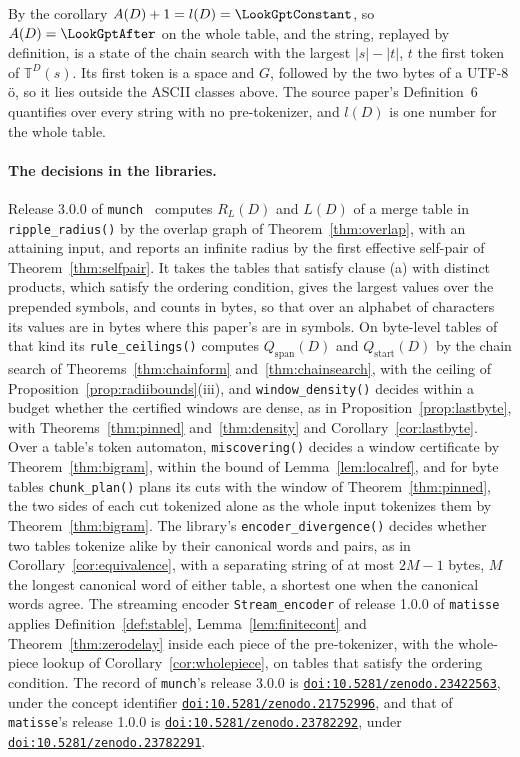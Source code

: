 \documentclass[11pt,a4paper]{article}
\newcommand{\doi}[1]{\href{https://doi.org/#1}{\nolinkurl{doi:#1}}}
\theoremstyle{definition}
\theoremstyle{plain}
\newcommand{\code}[1]{\texttt{#1}}
\newcommand{\T}{\mathbb{T}}
\newcommand{\ripple}{R_{L}}
\begin{document}
By the corollary \(A(D) + 1 = l(D) = \LookGptConstant\), so \(A(D) = \LookGptAfter\) on the whole table, and the string,
replayed by definition, is a state of the chain search with the largest \(|s| - |t|\), \(t\) the first token of
\(\T^D(s)\). Its first token is a space and \(G\), followed by the two bytes of a UTF-8 \"o, so it lies outside the
ASCII classes above. The source paper's Definition~6 quantifies over every string with no pre-tokenizer, and \(l(D)\) is
one number for the whole table.

\paragraph{The decisions in the libraries.} Release 3.0.0 of \code{munch}~\citep{munch} computes \(\ripple(D)\) and
\(L(D)\) of a merge table in \code{ripple\_radius()} by the overlap graph of Theorem~\ref{thm:overlap}, with an
attaining input, and reports an infinite radius by the first effective self-pair of Theorem~\ref{thm:selfpair}. It takes
the tables that satisfy clause (a) with distinct products, which satisfy the ordering condition, gives the largest
values over the prepended symbols, and counts in bytes, so that over an alphabet of characters its values are in bytes
where this paper's are in symbols. On byte-level tables of that kind its \code{rule\_ceilings()} computes
\(Q_{\mathrm{span}}(D)\) and \(Q_{\mathrm{start}}(D)\) by the chain search of Theorems~\ref{thm:chainform}
and~\ref{thm:chainsearch}, with the ceiling of Proposition~\ref{prop:radiibounds}(iii), and \code{window\_density()}
decides within a budget whether the certified windows are dense, as in Proposition~\ref{prop:lastbyte}, with
Theorems~\ref{thm:pinned} and~\ref{thm:density} and Corollary~\ref{cor:lastbyte}. Over a table's token automaton,
\code{miscovering()} decides a window certificate by Theorem~\ref{thm:bigram}, within the bound of
Lemma~\ref{lem:localref}, and for byte tables \code{chunk\_plan()} plans its cuts with the window of
Theorem~\ref{thm:pinned}, the two sides of each cut tokenized alone as the whole input tokenizes them by
Theorem~\ref{thm:bigram}. The library's \code{encoder\_divergence()} decides whether two tables tokenize alike by their
canonical words and pairs, as in Corollary~\ref{cor:equivalence}, with a separating string of at most \(2M - 1\) bytes,
\(M\) the longest canonical word of either table, a shortest one when the canonical words agree. The streaming encoder
\code{Stream\_encoder} of release 1.0.0 of \code{matisse}~\citep{matisse} applies Definition~\ref{def:stable},
Lemma~\ref{lem:finitecont} and Theorem~\ref{thm:zerodelay} inside each piece of the pre-tokenizer, with the whole-piece
lookup of Corollary~\ref{cor:wholepiece}, on tables that satisfy the ordering condition. The record of \code{munch}'s
release 3.0.0 is \doi{10.5281/zenodo.23422563}, under the concept identifier \doi{10.5281/zenodo.21752996}, and that of
\code{matisse}'s release 1.0.0 is \doi{10.5281/zenodo.23782292}, under \doi{10.5281/zenodo.23782291}.
\end{document}
